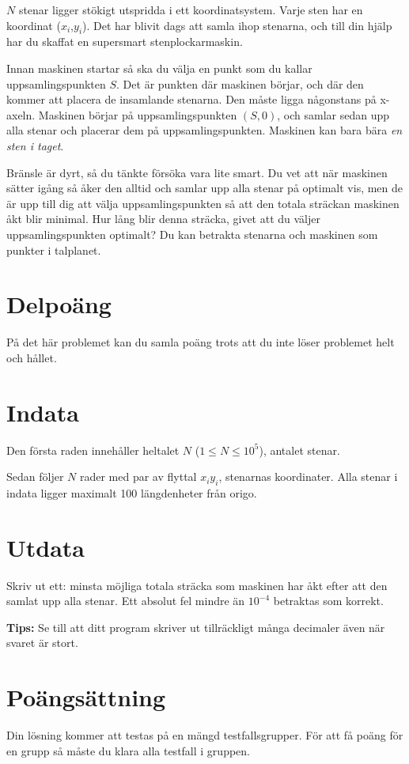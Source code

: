 
$N$ stenar ligger stökigt utspridda i ett koordinatsystem. Varje sten har en koordinat ($x_i$,$y_i$). Det har blivit dags att samla ihop stenarna, och till din hjälp har du skaffat en supersmart stenplockarmaskin.

Innan maskinen startar så ska du välja en punkt som du kallar uppsamlingspunkten $S$. Det är punkten där maskinen börjar, och där den kommer att placera de insamlande stenarna. Den måste ligga någonstans på x-axeln. Maskinen börjar på uppsamlingspunkten $(S,0)$, och samlar sedan upp alla stenar och placerar dem på uppsamlingspunkten. Maskinen kan bara bära \emph{en sten i taget}.

Bränsle är dyrt, så du tänkte försöka vara lite smart. Du vet att när maskinen sätter igång så åker den alltid och samlar upp alla stenar på optimalt vis, men de är upp till dig att välja uppsamlingspunkten så att den totala sträckan maskinen åkt blir minimal. Hur lång blir denna sträcka, givet att du väljer uppsamlingspunkten optimalt? Du kan betrakta stenarna och maskinen som punkter i talplanet.

\section*{Delpoäng}
På det här problemet kan du samla poäng trots att du inte löser problemet helt och hållet.

\section*{Indata}
Den första raden innehåller heltalet $N$ ($1 \leq N \leq 10^5$), antalet stenar.

Sedan följer $N$ rader med par av flyttal $x_i y_i$, stenarnas koordinater. Alla stenar i
indata ligger maximalt 100 längdenheter från origo.

\section*{Utdata}
Skriv ut ett: minsta möjliga totala sträcka som maskinen har åkt efter att den samlat upp alla stenar. Ett absolut fel mindre än $10^{-4}$ betraktas som korrekt.

{\bf Tips:} Se till att ditt program skriver ut tillräckligt många decimaler även när svaret är stort.

\section*{Poängsättning}
Din lösning kommer att testas på en mängd testfallsgrupper.
För att få poäng för en grupp så måste du klara alla testfall i gruppen.

